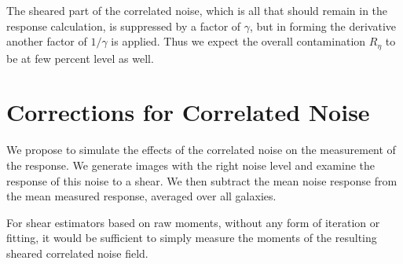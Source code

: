 \documentclass[usegraphicx,usenatbib]{mn2e}
\begin{document}
The sheared part of the correlated noise, which is all that should remain in
the response calculation, is suppressed by a factor of $\gamma$, but in forming
the derivative another factor of $1/\gamma$ is applied.  Thus we expect the
overall contamination $R_\eta$ to be at few percent level as well.

\section{Corrections for Correlated Noise} \label{sec:corr}

We propose to simulate the effects of the correlated noise on the measurement
of the response.  We generate images with the right noise level and examine
the response of this noise to a shear.  We then subtract the mean noise
response from the mean measured response, averaged over all galaxies.

For shear estimators based on raw moments, without any form of iteration or
fitting, it would be sufficient to simply measure the moments of the resulting
sheared correlated noise field.
\end{document}
